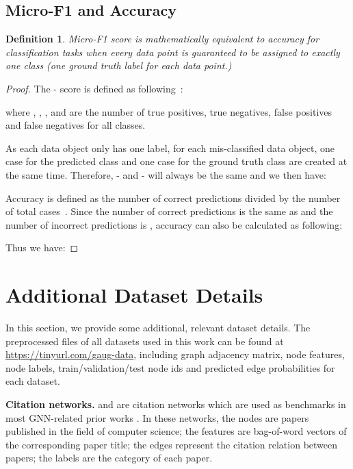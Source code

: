 \documentclass[letterpaper]{article} \usepackage{aaai21}  \usepackage{times}  \usepackage{helvet} \usepackage{courier}  \usepackage[hyphens]{url}  \usepackage{graphicx} \urlstyle{rm} \def\UrlFont{\rm}  \usepackage{natbib}  \usepackage{caption} \frenchspacing  \setlength{\pdfpagewidth}{8.5in}  \setlength{\pdfpageheight}{11in}
\newtheorem{dfn}{Definition}
\begin{document}
\subsection{Micro-F1 and Accuracy}
\label{appn:proof2}
\begin{dfn}
Micro-F1 score is mathematically equivalent to accuracy for classification tasks when every data point is guaranteed to be assigned to exactly one class (one ground truth label for each data point.)
\end{dfn}


\begin{proof}

The - score is defined as following~\cite{han2011data}: 

where , , , and  are the number of true positives, true negatives, false positives and false negatives for all classes. 

As each data object only has one label, for each mis-classified data object, one  case for the predicted class and one  case for the ground truth class are created at the same time. Therefore, - and - will always be the same and we then have:


Accuracy is defined as the number of correct predictions divided by the number of total cases~\cite{han2011data}. Since the number of correct predictions is the same as  and the number of incorrect predictions is , accuracy can also be calculated as following:


Thus we have:


\end{proof}


\section{Additional Dataset Details}
\label{appn:data}
In this section, we provide some additional, relevant dataset details. The preprocessed files of all datasets used in this work can be found at \url{https://tinyurl.com/gaug-data}, including graph adjacency matrix, node features, node labels, train/validation/test node ids and predicted edge probabilities for each dataset.

\noindent \textbf{Citation networks.} \cora and \citeseer are citation networks which are used as benchmarks in most GNN-related prior works \cite{kipf2016semi, velivckovic2017graph, rong2019dropedge, chen2019measuring}. In these networks, the nodes are papers published in the field of computer science; the features are bag-of-word vectors of the corresponding paper title; the edges represent the citation relation between papers; the labels are the category of each paper.
\end{document}
